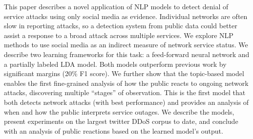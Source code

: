 This paper describes a novel application of NLP models to detect denial of service attacks using only social media as evidence.  Individual networks are often slow in reporting attacks, so a detection system from public data could better assist a response to a broad attack across multiple services.  We explore NLP methods to use social media as an indirect measure of network service status.  We describe two learning frameworks for this task: a feed-forward neural network and a partially labeled LDA model. Both models outperform previous work by significant margins (20\% F1 score).  We further show that the topic-based model enables the first fine-grained analysis of how the public reacts to ongoing network attacks, discovering multiple ``stages'' of observation.  This is the first model that both detects network attacks (with best performance) and provides an analysis of when and how the public interprets service outages.  We describe the models, present experiments on the largest twitter DDoS corpus to date, and conclude with an analysis of public reactions based on the learned model's output.
